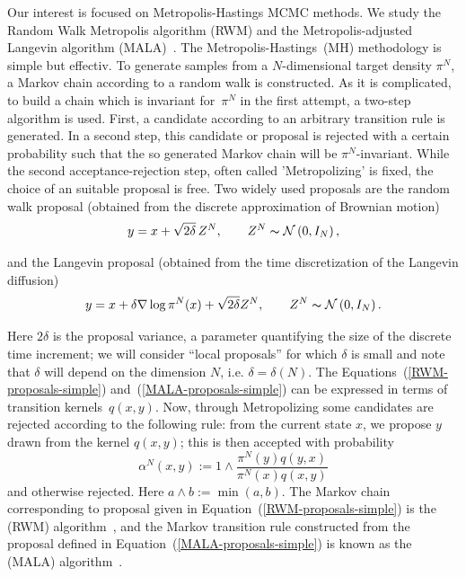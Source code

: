 Our interest is focused on Metropolis-Hastings MCMC methods. We study the Random Walk Metropolis algorithm (RWM) and the Metropolis-adjusted Langevin algorithm (MALA)~\autocite{Liu2004, Robert2005}. The Metropolis-Hastings~(MH) methodology is simple but effectiv. To generate samples from a $N$-dimensional target density $ \pi^{N} $, a Markov chain according to a random walk is constructed. As it is complicated, to build a chain which is invariant for~$\pi^N$ in the first attempt, a two-step algorithm is used. First,  a candidate according to an arbitrary transition rule is generated. In a second step, this candidate or proposal is rejected with a certain probability such that the so generated Markov chain will be $\pi^N$-invariant. While the second acceptance-rejection step, often called 'Metropolizing' is fixed, the choice of an suitable proposal is free. Two widely used proposals are the random walk proposal (obtained from
the discrete approximation of Brownian motion)
\begin{equation}
\label{RWM-proposals-simple} 
  y = x + \sqrt{2\delta}\,Z^{N}, \qquad Z^{N} \thicksim \mathcal{N}\left( 0,I_N \right),
\end{equation}

and the Langevin proposal (obtained from the time discretization of the
Langevin diffusion)
\begin{equation}
\label{MALA-proposals-simple}
  y = x +  \delta \nabla \log \pi^{N} (x) + \sqrt{2\delta} Z^N, \qquad Z^{N} \thicksim \mathcal{N}\left( 0,I_N \right).
\end{equation}

Here $ 2 \delta $ is the proposal variance, a parameter quantifying the size of the discrete time increment; we will consider “local proposals” for which $ \delta $ is
small and note that $ \delta $ will depend on the dimension $N$, i.e. $\delta  = \delta(N) $. The Equations~(\ref{RWM-proposals-simple}) and~(\ref{MALA-proposals-simple}) can be expressed in terms of transition kernels~$q(x,y)$. Now, through Metropolizing some candidates are rejected according to the following rule: from the current state $ x $, we propose $ y $ drawn from the kernel $ q(x, y) $; this is then accepted with probability
\begin{equation}
\label{acceptance probability simple}
 \alpha^{N}(x,y)  := 1 \wedge \dfrac{\pi^{N}(y) q(y,x) }{\pi^{N}(x) q(x,y)}
\end{equation}
and otherwise rejected. Here $ a \wedge b := \min (a,b)$. The Markov chain corresponding to proposal given in Equation~(\ref{RWM-proposals-simple}) is the (RWM) algorithm~\autocite{Metropolis1953}, and the Markov transition rule constructed from the proposal defined in Equation~(\ref{MALA-proposals-simple}) is known as the (MALA) algorithm~\autocite{Robert2005}.

